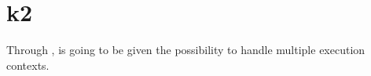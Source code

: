 %
%
%
%
%
%

%
%

\chapter{k2}
\label{chapter:k2}

Through ,  is going to be given the possibility to
handle multiple execution contexts.

\newpage

%
%

